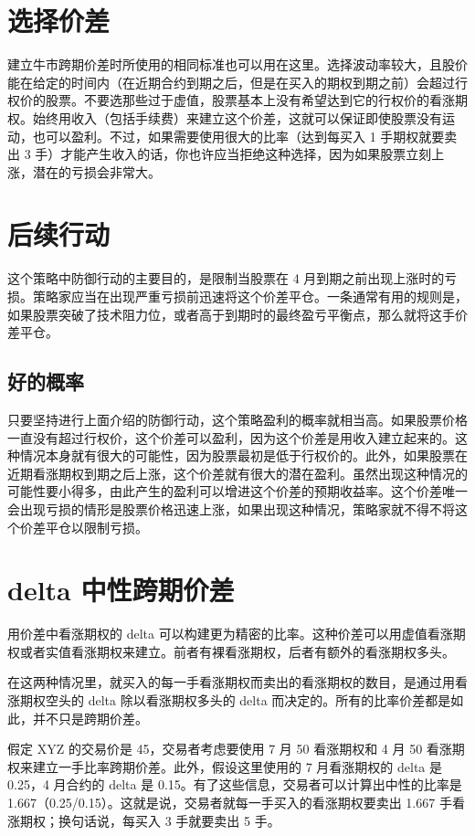 \section{选择价差}
建立牛市跨期价差时所使用的相同标准也可以用在这里。选择波动率较大，且股价能在给定的时间内（在近期合约到期之后，但是在买入的期权到期之前）会超过行权价的股票。不要选那些过于虚值，股票基本上没有希望达到它的行权价的看涨期权。始终用收入（包括手续费）来建立这个价差，这就可以保证即使股票没有运动，也可以盈利。不过，如果需要使用很大的比率（达到每买入 1 手期权就要卖出 3 手）才能产生收入的话，你也许应当拒绝这种选择，因为如果股票立刻上涨，潜在的亏损会非常大。

\section{后续行动}
这个策略中防御行动的主要目的，是限制当股票在 4 月到期之前出现上涨时的亏损。策略家应当在出现严重亏损前迅速将这个价差平仓。一条通常有用的规则是，如果股票突破了技术阻力位，或者高于到期时的最终盈亏平衡点，那么就将这手价差平仓。
\subsection{好的概率}
只要坚持进行上面介绍的防御行动，这个策略盈利的概率就相当高。如果股票价格一直没有超过行权价，这个价差可以盈利，因为这个价差是用收入建立起来的。这种情况本身就有很大的可能性，因为股票最初是低于行权价的。此外，如果股票在近期看涨期权到期之后上涨，这个价差就有很大的潜在盈利。虽然出现这种情况的可能性要小得多，由此产生的盈利可以增进这个价差的预期收益率。这个价差唯一会出现亏损的情形是股票价格迅速上涨，如果出现这种情况，策略家就不得不将这个价差平仓以限制亏损。

\section{delta 中性跨期价差}
用价差中看涨期权的 delta 可以构建更为精密的比率。这种价差可以用虚值看涨期权或者实值看涨期权来建立。前者有裸看涨期权，后者有额外的看涨期权多头。

在这两种情况里，就买入的每一手看涨期权而卖出的看涨期权的数目，是通过用看涨期权空头的 delta 除以看涨期权多头的 delta 而决定的。所有的比率价差都是如此，并不只是跨期价差。

假定 XYZ 的交易价是 45，交易者考虑要使用 7 月 50 看涨期权和 4 月 50 看涨期权来建立一手比率跨期价差。此外，假设这里使用的 7 月看涨期权的 delta 是 0.25，4 月合约的 delta 是 0.15。有了这些信息，交易者可以计算出中性的比率是 1.667（0.25/0.15）。这就是说，交易者就每一手买入的看涨期权要卖出 1.667 手看涨期权；换句话说，每买入 3 手就要卖出 5 手。

